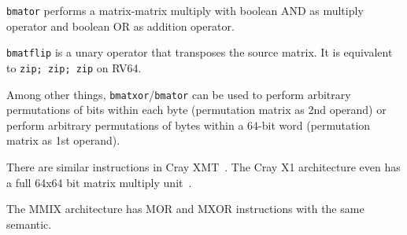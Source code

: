 \texttt{bmator} performs a matrix-matrix multiply with boolean AND as multiply
operator and boolean OR as addition operator.

\texttt{bmatflip} is a unary operator that transposes the source matrix. It is
equivalent to \texttt{zip; zip; zip} on RV64.

Among other things, \texttt{bmatxor}/\texttt{bmator} can be used to perform
arbitrary permutations of bits within each byte (permutation matrix as 2nd
operand) or perform arbitrary permutations of bytes within a 64-bit word
(permutation matrix as 1st operand).

There are similar instructions in Cray XMT~\cite{CrayXMT}. The Cray X1
architecture even has a full 64x64 bit matrix multiply unit~\cite{CrayX1}.

The MMIX architecture has MOR and MXOR instructions with the same semantic.~\cite[p.~182f]{Knuth4A}


